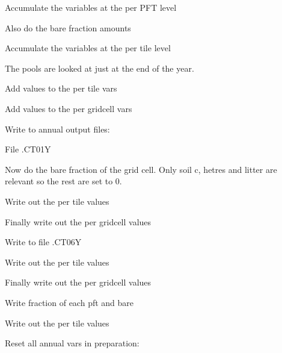 Accumulate the variables at the per P\+F\+T level

Also do the bare fraction amounts

Accumulate the variables at the per tile level

The pools are looked at just at the end of the year.

Add values to the per tile vars

Add values to the per gridcell vars

Write to annual output files\+:

File .C\+T01\+Y

Now do the bare fraction of the grid cell. Only soil c, hetres and litter are relevant so the rest are set to 0.

Write out the per tile values

Finally write out the per gridcell values

Write to file .C\+T06\+Y

Write out the per tile values

Finally write out the per gridcell values

Write fraction of each pft and bare

Write out the per tile values

Reset all annual vars in preparation\+: 